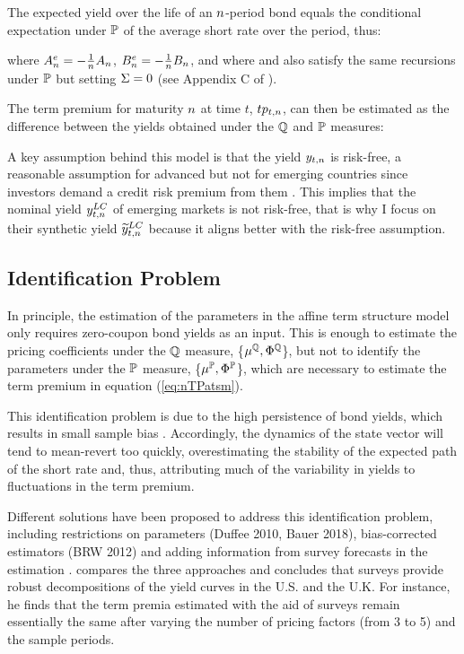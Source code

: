 {The expected yield over the life of an \(n\)-period bond equals the conditional expectation under \(\mathbb{P}\) of the average short rate over the period, thus:

\noindent where \(A_{n}^{e} = - \frac{1}{n} A_{n}\), \(B_{n}^{e} = - \frac{1}{n} B_{n}\), and where  and  also satisfy the same recursions under \(\mathbb{P}\) but setting \(\Sigma = 0\) (see Appendix C of \cite{Guimaraes:2014}).

The term premium for maturity $n$ at time $t$, $tp_{t,n}$, can then be estimated as the difference between the yields obtained under the $\mathbb{Q}$ and $\mathbb{P}$ measures:
	
A key assumption behind this model is that the yield $y_{t,n}$ is risk-free, a reasonable assumption for advanced but not for emerging countries since investors demand a credit risk premium from them \citep{DuSchreger:2016JoF}. 
This implies that the nominal yield $y_{t,n} ^{LC}$ of emerging markets is not risk-free, that is why I focus on their synthetic yield $\widetilde{y}_{t,n} ^{LC}$ because it aligns better with the risk-free assumption.

\subsection{Identification Problem} \label{sec:Identification}
\iftoggle{toclinks}{\gototoc}{} %

In principle, the estimation of the parameters in the affine term structure model only  requires zero-coupon bond yields as an input.
This is enough to estimate the pricing coefficients under the $\mathbb{Q}$ measure,
\{\(\mu^{\mathbb{Q}}, \Phi^{\mathbb{Q}}\)\}, but not to identify the parameters under the $\mathbb{P}$ measure, 
\{\(\mu^{\mathbb{P}}, \Phi^{\mathbb{P}}\)\}, which are necessary to estimate the term premium in equation (\ref{eq:nTPatsm}).

This identification problem is due to the high persistence of bond yields, which results in small sample bias \citep{KimOrphanides:2012,Guimaraes:2014}. Accordingly, the dynamics of the state vector will tend to mean-revert too quickly, overestimating the stability of the expected path of the short rate and, thus, attributing much of the variability in yields to fluctuations in the term premium.

Different solutions have been proposed to address this identification problem, including restrictions on parameters (Duffee 2010, Bauer 2018), bias-corrected estimators (BRW 2012) and adding information from survey forecasts in the estimation \citep{KimWright:2005,KimOrphanides:2012,Guimaraes:2014}.
\cite{Guimaraes:2014} compares the three approaches and concludes that surveys provide robust decompositions of the yield curves in the U.S. and the U.K. For instance, he finds that the term premia estimated with the aid of surveys remain essentially the same after varying the number of pricing factors (from 3 to 5) and the sample periods.

}
